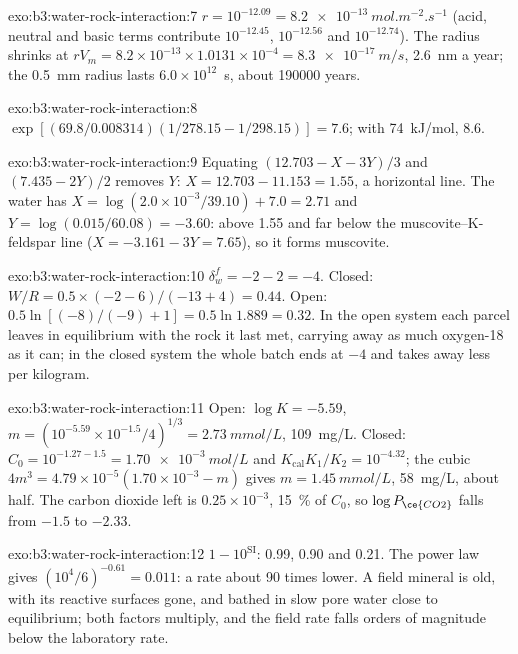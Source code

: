 \begin{solution}{exo:b3:water-rock-interaction:7}
$r = 10^{-12.09} = \qty{8.2e-13}{mol.m^{-2}.s^{-1}}$ (acid, neutral and
basic terms contribute $10^{-12.45}$, $10^{-12.56}$ and $10^{-12.74}$). The
radius shrinks at $rV_m = 8.2\times10^{-13}\times1.0131\times10^{-4} =
\qty{8.3e-17}{m/s}$, \qty{2.6}{nm} a year; the \qty{0.5}{mm} radius lasts
$6.0\times10^{12}$~s, about \num{190000} years.
\end{solution}

\begin{solution}{exo:b3:water-rock-interaction:8}
$\exp[(69.8/0.008314)(1/278.15 - 1/298.15)] = 7.6$; with
\qty{74}{kJ/mol}, 8.6.
\end{solution}

\begin{solution}{exo:b3:water-rock-interaction:9}
Equating $(12.703 - X - 3Y)/3$ and $(7.435 - 2Y)/2$ removes $Y$: $X =
12.703 - 11.153 = 1.55$, a horizontal line. The water has $X = \log(2.0\times
10^{-3}/39.10) + 7.0 = 2.71$ and $Y = \log(0.015/60.08) = -3.60$: above 1.55
and far below the muscovite--K-feldspar line ($X = -3.161 - 3Y = 7.65$), so
it forms muscovite.
\end{solution}

\begin{solution}{exo:b3:water-rock-interaction:10}
$\delta_w^f = -2 - 2 = -4$. Closed: $W/R = 0.5\times(-2 - 6)/(-13 + 4) =
0.44$. Open: $0.5\ln[(-8)/(-9) + 1] = 0.5\ln1.889 = 0.32$. In the open system each
parcel leaves in equilibrium with the rock it last met, carrying away as much
oxygen-18 as it can; in the closed system the whole batch ends at $-4$ and
takes away less per kilogram.
\end{solution}

\begin{solution}{exo:b3:water-rock-interaction:11}
Open: $\log K = -5.59$, $m = (10^{-5.59}\times10^{-1.5}/4)^{1/3} =
\qty{2.73}{mmol/L}$, \qty{109}{mg/L}. Closed: $C_0 = 10^{-1.27 - 1.5} =
\qty{1.70e-3}{mol/L}$ and $K_{\mathrm{cal}}K_1/K_2 = 10^{-4.32}$; the cubic
$4m^3 = 4.79\times10^{-5}(1.70\times10^{-3} - m)$ gives $m =
\qty{1.45}{mmol/L}$, \qty{58}{mg/L}, about half. The carbon dioxide left is
$0.25\times10^{-3}$, \qty{15}{\percent} of $C_0$, so $\log P_{\ce{CO2}}$ falls
from $-1.5$ to $-2.33$.
\end{solution}

\begin{solution}{exo:b3:water-rock-interaction:12}
$1 - 10^{\mathrm{SI}}$: 0.99, 0.90 and 0.21. The power law gives
$(10^4/6)^{-0.61} = 0.011$: a rate about 90 times lower. A field mineral is
old, with its reactive surfaces gone, and bathed in slow pore water close to
equilibrium; both factors multiply, and the field rate falls orders of
magnitude below the laboratory rate.
\end{solution}

